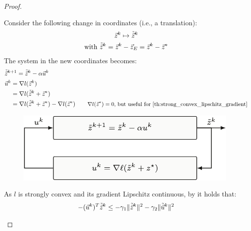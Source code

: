 \begin{theorem}
\begin{proof}
\begin{enumerate}
                Consider the following change in coordinates (i.e., a translation):
                \[ 
                    \begin{gathered}
                        {\vec{z}}^k \mapsto \tilde{{\vec{z}}}^k \\
                        \text{with } \tilde{{\vec{z}}}^k = {\vec{z}}^k - {\vec{z}}_E = {\vec{z}}^k - {\vec{z}}^*
                    \end{gathered}
                \]
                The system in the new coordinates becomes:
                \[
                    \begin{aligned}
                        &\tilde{\z}^{k+1} = \tilde{\z}^k - \alpha \vec{u}^k \\
                        &\begin{aligned}
                            \vec{u}^k &= \nabla l(\z^k) \\
                            &= \nabla l(\tilde{\z}^k + \z^*) \\
                            &= \nabla l(\tilde{\z}^k + \z^*) - \nabla l(\z^*) & & & \text{\small $\nabla l(\z^*)=0$, but useful for \Cref{th:strong_convex_lipschitz_gradient}}
                        \end{aligned}
                    \end{aligned}
                \]

                \begin{figure}[H]
                    \centering
                    \includegraphics[width=0.55\linewidth]{./img/_gradient_method_integrator_new_coords.pdf}
                \end{figure}

                \begin{remark}
                    As $l$ is strongly convex and its gradient Lipschitz continuous, by  it holds that:
                    \[
                        -(\vec{u}^k)^T \tilde{{\vec{z}}}^k \leq - \gamma_1 \Vert \tilde{{\vec{z}}}^k \Vert^2 - \gamma_2 \Vert \tilde{\vec{u}}^k \Vert^2
                    \]
                \end{remark}


\end{enumerate}
\end{proof}
\end{theorem}
